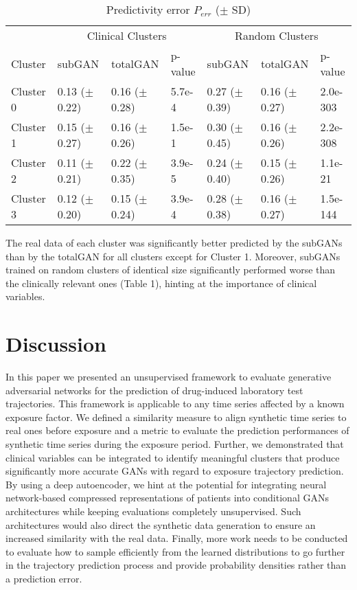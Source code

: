 \documentclass{article}
\begin{document}
\begin{table}[h]
  \caption{Predictivity error $P_{err}$ ($\pm$ SD)}
  \label{sample-table}
  \centering
  \begin{tabular}{lllllll}
 	\midrule
    & \multicolumn{3}{c}{Clinical Clusters}
    &
    \multicolumn{3}{c}{Random Clusters} \\
    \cmidrule(r){2-4}\cmidrule(l){5-7}
    Cluster     & subGAN  & totalGAN & p-value & subGAN & totalGAN & p-value\\
    \midrule
    Cluster 0 & 0.13 ($\pm$0.22)  &  0.16 ($\pm$0.28)  & 5.7e-4 & 0.27 ($\pm$0.39) & 0.16 ($\pm$0.27) & 2.0e-303 \\
   	Cluster 1 & 0.15 ($\pm$0.27) & 0.16 ($\pm$0.26) & 1.5e-1 & 0.30 ($\pm$0.45) & 0.16 ($\pm$0.26) & 2.2e-308  \\
   	Cluster 2 & 0.11 ($\pm$0.21) & 0.22 ($\pm$0.35) & 3.9e-5 & 0.24 ($\pm$0.40) & 0.15 ($\pm$0.26) & 1.1e-21  \\
    Cluster 3 & 0.12 ($\pm$0.20) & 0.15 ($\pm$0.24) & 3.9e-4 & 0.28 ($\pm$0.38) & 0.16 ($\pm$0.27) & 1.5e-144  \\
    \bottomrule
  \end{tabular}
\end{table}

The real data of each cluster was significantly better predicted by the subGANs than by the totalGAN for all clusters except for Cluster 1. Moreover, subGANs trained on random clusters of identical size significantly performed worse than the clinically relevant ones (Table 1), hinting at the importance of clinical variables.

\section{Discussion}

In this paper we presented an unsupervised framework to evaluate generative adversarial networks for the prediction of drug-induced laboratory test trajectories. This framework is applicable to any time series affected by a known exposure factor. We defined a similarity measure to align synthetic time series to real ones before exposure and a metric to evaluate the prediction performances of synthetic time series during the exposure period. Further, we demonstrated that clinical variables can be integrated to identify meaningful clusters that produce significantly more accurate GANs with regard to exposure trajectory prediction. By using a deep autoencoder, we hint at the potential for integrating neural network-based compressed representations of patients into conditional GANs architectures while keeping evaluations completely unsupervised. Such architectures would also direct the synthetic data generation to ensure an increased similarity with the real data. Finally, more work needs to be conducted to evaluate how to sample efficiently from the learned distributions to go further in the trajectory prediction process and provide probability densities rather than a prediction error.
\end{document}

